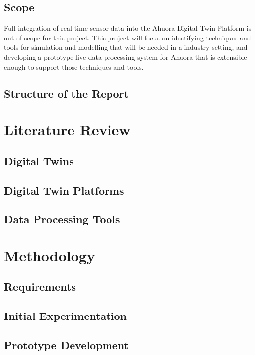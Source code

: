 \documentclass[12pt]{book}
\begin{document}
\section{Scope}

Full integration of real-time sensor data into the Ahuora Digital Twin Platform is out of scope for this project. 
This project will focus on identifying techniques and tools for simulation and modelling that will be needed in a industry setting,
and developing a prototype live data processing system for Ahuora that is extensible enough to support those techniques and tools.

\section{Structure of the Report}

\chapter{Literature Review}

\section{Digital Twins}

\section{Digital Twin Platforms}

\section{Data Processing Tools}

\chapter{Methodology}

\section{Requirements}

\section{Initial Experimentation}

\section{Prototype Development}
\end{document}
